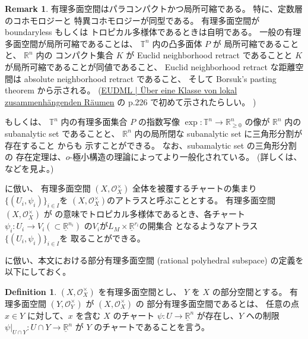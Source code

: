 \documentclass[a4paper,dvipdfmx,reqno,12pt]{amsart}
\theoremstyle{definition}
\newtheorem{definition}[theorem]{Definition}
\newtheorem{remark}[theorem]{Remark}
\newcommand{\opn}[1]{\operatorname{#1}}
\numberwithin{equation}{section}
\begin{document}
\begin{remark}
有理多面空間はパラコンパクトかつ局所可縮である。
特に、定数層のコホモロジーと
特異コホモロジーが同型である。
有理多面空間が
boundaryless もしくは
トロピカル多様体であるときは自明である。
一般の有理多面空間が局所可縮であることは、
$\mathbb{T}^{n}$ 内の凸多面体 $P$ が
局所可縮であることと、
$\mathbb{R}^{n}$ 内の コンパクト集合 $K$ が Euclid 
neighborhood retract であることと
$K$が局所可縮であることが同値であること、
Euclid neighborhood retract な距離空間は
absolute neighborhood retract であること、
そして Borsuk's pasting theorem から示される。
(\href{https://eudml.org/doc/212574}{EUDML | Über eine Klasse von lokal zusammenhängenden Räumen}
の p.226 で初めて示されたらしい。
)

もしくは、
$\mathbb{T}^{n}$ 内の有理多面集合 $P$ の指数写像
$\opn{exp}\colon \mathbb{T}^{n}\to 
\mathbb{R}^{n}_{\geq 0}$ の像が $\mathbb{R}^{n}$
内の subanalytic set であることと、
$\mathbb{R}^{n}$ 内の局所閉な
subanalytic set に三角形分割が存在すること
\cite{MR760983} からも
示すことができる。
なお、subamalytic set の三角形分割の
存在定理は、$o$-極小構造の理論によってより一般化されている。
(詳しくは、\cite[Theorem II]{MR1463945} などを見よ。)
\end{remark}

\cite{demedrano2023chern}に倣い、
有理多面空間 $(X,\mathcal{O}_X^{\times})$
全体を被覆するチャートの集まり
$\{(U_i,\psi_i)\}_{i\in I}$を
$(X,\mathcal{O}_X^{\times})$のアトラスと呼ぶこととする。
有理多面空間$(X,\mathcal{O}_X^{\times})$ が
\cite[Definition 6.1]{gross2019sheaftheoretic}
の意味でトロピカル多様体であるとき、各チャート
$\psi_i\colon U_i\to V_i(\subset \underline{\mathbb{R}}^{n_i})$
の$V_i$が$L_M\times \underline{\mathbb{R}}^{r_i}$の開集合
となるようなアトラス$\{(U_i,\psi_i)\}_{i\in I}$を
取ることができる。

\cite[Definition 2.14]{demedrano2023chern}
に倣い、本文における部分有理多面空間
(rational polyhedral subspace)
の定義を以下にしておく。


\begin{definition}

$(X,\mathcal{O}_X^{\times})$ を有理多面空間とし、
$Y$ を $X$ の部分空間とする。
有理多面空間 $(Y,\mathcal{O}_Y^{\times})$ が 
$(X,\mathcal{O}_X^{\times})$ の
部分有理多面空間であるとは、
任意の点 $x\in Y$ に対して、$x$ を含む
$X$ のチャート $\psi \colon U\to \underline{\mathbb{R}}^{n}$
が存在し、$Y$ への制限 
$\psi|_{U\cap Y}\colon U\cap Y \to \underline{\mathbb{R}}^{n}$
が $Y$ のチャートであることを言う。
\end{definition}
\end{document}
